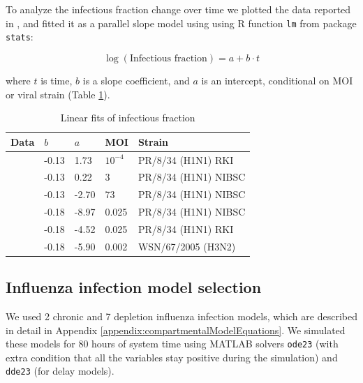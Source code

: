 To analyze the infectious fraction change over time we plotted the data reported in \cite{rudiger2019multiscale, schulze2009infection}, and fitted it as a parallel slope model using using R function \texttt{lm} from package \texttt{stats}:

\begin{equation}
\log(\text{Infectious fraction}) = a + b \cdot t
\end{equation}

where $t$ is time, $b$ is a slope coefficient, and $a$ is an intercept, conditional on MOI \cite{rudiger2019multiscale} or viral strain \cite{schulze2009infection} (Table \ref{table:linearFitsInfectiousFraction}).

\begin{table}[h!]
\centering
\caption[Linear fits of infectious fraction]{Linear fits of infectious fraction}
\label{table:linearFitsInfectiousFraction}

\begin{tabular}{p{2cm} p{2cm} p{2cm} p{2cm} p{4cm}}
\hline 
\textbf{Data} & $b$ & $a$ &  \textbf{MOI} & \textbf{Strain}\\
\hline
\cite{rudiger2019multiscale} & -0.13 & 1.73 & $10^{-4}$ & PR/8/34 (H1N1) RKI\\
\cite{rudiger2019multiscale} & -0.13 & 0.22 & 3 & PR/8/34 (H1N1) NIBSC\\
\cite{rudiger2019multiscale} & -0.13 & -2.70 & 73 & PR/8/34 (H1N1) NIBSC\\
\hline
\cite{schulze2009infection} & -0.18 & -8.97 & 0.025 & PR/8/34 (H1N1) NIBSC\\
\cite{schulze2009infection} & -0.18 & -4.52 & 0.025 & PR/8/34 (H1N1) RKI\\
\cite{schulze2009infection} & -0.18 & -5.90 & 0.002 & WSN/67/2005 (H3N2)\\
\hline
\end{tabular}
\end{table}

\subsection{Influenza infection model selection}

We used 2 chronic and 7 depletion influenza infection models, which are described in detail in Appendix \ref{appendix:compartmentalModelEquations}. We simulated these models for 80 hours of  system time using MATLAB solvers \texttt{ode23} (with extra condition that all the variables stay positive during the simulation) and \texttt{dde23} (for delay models).

